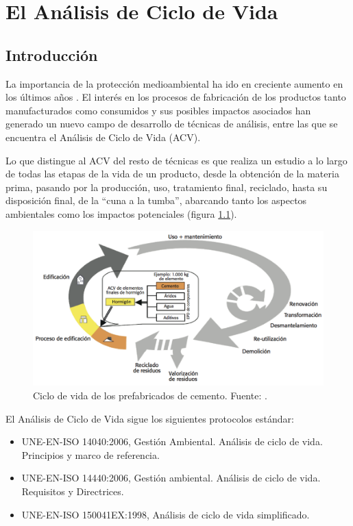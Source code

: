 \chapter{El Análisis de Ciclo de Vida}
\section{Introducción}
La importancia de la protección medioambiental ha ido en creciente aumento en los últimos años \cite{iso14040}. El interés en los procesos de fabricación de los productos tanto manufacturados como consumidos y sus posibles impactos asociados han generado un nuevo campo de desarrollo de técnicas de análisis, entre las que se encuentra el Análisis de Ciclo de Vida (ACV).

Lo que distingue al ACV del resto de técnicas es que realiza un estudio a lo largo de todas las etapas de la vida de un producto, desde la obtención de la materia prima, pasando por la producción, uso, tratamiento final, reciclado, hasta su disposición final, de la ``cuna a la tumba'', abarcando tanto los aspectos ambientales como los impactos potenciales (figura \ref{fig:ciclodevidaprefabric}).

\begin{figure}[!htb]
\centering
\includegraphics[width=15cm]{ciclodevida.png}
\caption[Ciclo de vida de los prefabricados de cemento.]{Ciclo de vida de los prefabricados de cemento. Fuente: \cite{oficemen}.}
\label{fig:ciclodevidaprefabric}
\end{figure}

El Análisis de Ciclo de Vida sigue los siguientes protocolos estándar:
\begin{itemize}
\item UNE-EN-ISO 14040:2006, Gestión Ambiental. Análisis de ciclo de vida. Principios y marco de referencia.
\item UNE-EN-ISO 14440:2006, Gestión ambiental. Análisis de ciclo de vida. Requisitos y Directrices.
\item UNE-EN-ISO 150041EX:1998, Análisis de ciclo de vida simplificado.
\end{itemize}

